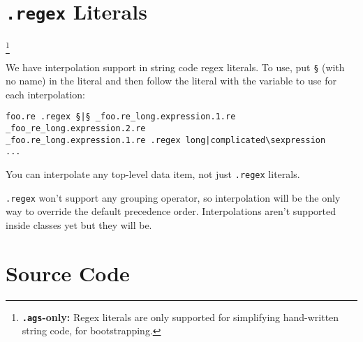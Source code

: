 \documentclass{report}
\newcommand\stringcode[1]{\texttt{#1}}
\newcommand\agsonly[1]{\footnote{\textbf{\texttt{.ags}-only: }#1}}
\begin{document}
\chapter{\stringcode{.regex} Literals}\agsonly{Regex literals are only supported for simplifying hand-written string code, for bootstrapping.}

We have interpolation support in string code regex literals.
To use, put \stringcode{§} (with no name) in the literal
and then follow the literal with the variable to use for each interpolation:
\begin{verbatim}
foo.re .regex §|§ _foo.re_long.expression.1.re _foo_re_long.expression.2.re
_foo.re_long.expression.1.re .regex long|complicated\sexpression
...
\end{verbatim}

You can interpolate any top-level data item, not just \stringcode{.regex} literals.

\stringcode{.regex} won't support any grouping operator,
so interpolation will be the only way to override the default precedence order.
Interpolations aren't supported inside classes yet but they will be.

\chapter{Source Code}
\end{document}
